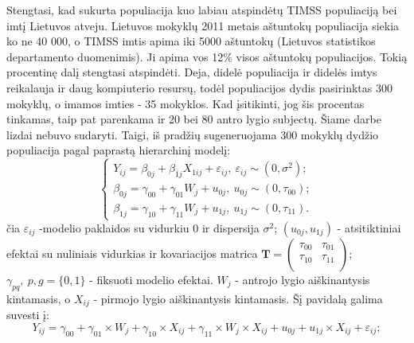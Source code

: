 \documentclass[12pt,a4paper]{article}
\begin{document}
\indent Stengtasi, kad sukurta populiacija kuo labiau atspindėtų TIMSS populiaciją bei imtį Lietuvos atveju. Lietuvos mokyklų 2011 metais aštuntokų populiacija siekia ko ne 40 000, o TIMSS imtis apima iki 5000 aštuntokų (Lietuvos statistikos departamento duomenimis). Ji apima vos 12\% visos aštuntokų populiacijos. Tokią procentinę dalį stengtasi atspindėti. Deja, didelė populiacija ir didelės imtys reikalauja ir daug kompiuterio resursų, todėl populiacijos dydis pasirinktas 300 mokyklų, o imamos imties - 35 mokyklos. Kad įsitikinti, jog šis procentas tinkamas, taip pat parenkama ir 20 bei 80 antro lygio subjectų. Šiame darbe lizdai nebuvo sudaryti. Taigi, iš pradžių sugeneruojama 300 mokyklų dydžio populiacija pagal paprastą hierarchinį modelį:
\begin{equation}\label{eq:simul}
\left\{
\begin{array}{l}
Y_{ij}=\beta_{0j}+\beta_{1j}X_{1ij}+\varepsilon_{ij}, \ \varepsilon_{ij}\sim (0, \sigma^2);\\
\beta_{0j}=\gamma_{00}+\gamma_{01}W_j+u_{0j}, \ u_{0j}\sim (0, \tau_{00});\\
\beta_{1j}=\gamma_{10}+\gamma_{11}W_j+u_{1j}, \ u_{1j}\sim (0, \tau_{11}).
\end{array} \right.
\end{equation}
čia $\varepsilon_{ij}$ -modelio paklaidos su vidurkiu $0$ ir dispersija $\sigma^2$; $\left(u_{0j}, u_{1j}\right)$ - atsitiktiniai efektai su nuliniais vidurkias ir kovariacijos matrica $\mathbf{T}=\begin{pmatrix}
\tau_{00} & \tau_{01} \\
\tau_{10} & \tau_{11} \\
\end{pmatrix}$; $\gamma_{pq},\ p,g = \{0,1\}$ - fiksuoti modelio efektai. $W_j$ - antrojo lygio aiškinantysis kintamasis, o $X_{ij}$ - pirmojo lygio aiškinantysis kintamasis. Šį pavidalą galima suvesti į:
\begin{equation} \label{eq:deq}
Y_{ij} = \gamma_{00} +\gamma_{01}\times W_{j}+ \gamma_{10}\times X_{ij}+\gamma_{11}\times W_{j}\times X_{ij}+u_{0j}+u_{1j}\times X_{ij}+\varepsilon_{ij};
\end{equation}
\end{document}
